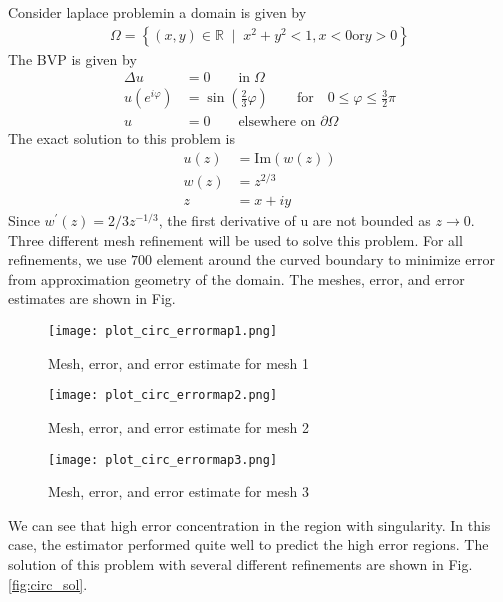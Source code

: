 \documentclass[11pt, letterpaper, hidelinks]{article}
\theoremstyle{definition}
\newcommand {\mb}[1]{\ensuremath{\mathbb #1}}
\begin{document}
Consider laplace problemin a domain is given by
\begin{align*}
    \Omega = \left\{ (x,y) \in \mb{R} \;\; | \;\; x^2+y^2 < 1, x<0 \text{or} y>0 \right\}
\end{align*}
The BVP is given by
\begin{align*}
    \Delta u        & = 0 \qquad \text{in} \; \Omega                                                               \\
    u(e^{i\varphi}) & = \sin\left(\frac{2}{3}\varphi\right) 	\qquad \text{for} \quad 0\le\varphi\le \frac{3}{2}\pi \\
    u               & = 0 \qquad \text{elsewhere on } \partial \Omega
\end{align*}
The exact solution to this problem is
\begin{align*}
    u(z) & = \text{Im}\left( w(z) \right) \\
    w(z) & = z^{2/3}                      \\
    z    & = x + iy
\end{align*}
Since $w^{\prime}(z)=2/3z^{-1/3}$, the first derivative of u are not bounded as $z\rightarrow 0$. Three different mesh refinement will be used to solve this problem. For all refinements, we use $700$ element around the curved boundary to minimize error from approximation geometry of the domain. The meshes, error, and error estimates are shown in Fig.\

\begin{figure}[H]
    \texttt{[image: plot\_circ\_errormap1.png]}
    \centering
    \caption{Mesh, error, and error estimate for mesh 1}
    \label{fig:circ_errormap1}
\end{figure}

\begin{figure}[H]
    \texttt{[image: plot\_circ\_errormap2.png]}
    \centering
    \caption{Mesh, error, and error estimate for mesh 2}
    \label{fig:circ_errormap2}
\end{figure}

\begin{figure}[H]
    \texttt{[image: plot\_circ\_errormap3.png]}
    \centering
    \caption{Mesh, error, and error estimate for mesh 3}
    \label{fig:circ_errormap3}
\end{figure}

We can see that high error concentration in the region with singularity. In this case, the estimator performed quite well to predict the high error regions. The solution of this problem with several different refinements are shown in Fig.\ref{fig:circ_sol}.
\end{document}
